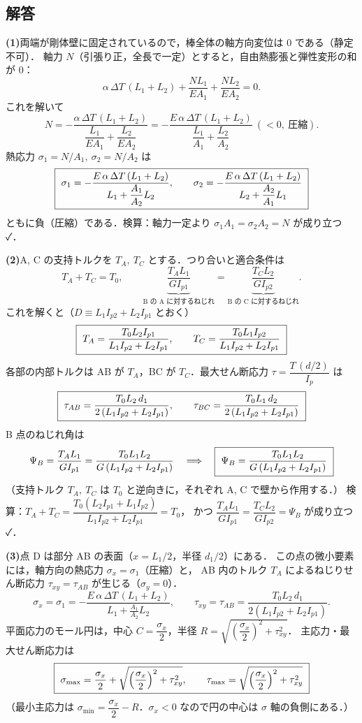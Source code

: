 \documentclass[11pt,a4paper]{article}
\begin{document}
\subsection*{解答}

\noindent\textbf{(1)}\quad 両端が剛体壁に固定されているので，棒全体の軸方向変位は 0 である（静定不可）．
軸力 $N$（引張り正，全長で一定）とすると，自由熱膨張と弾性変形の和が 0：
\[
  \alpha\,\Delta T\,(L_1+L_2)+\frac{N L_1}{E A_1}+\frac{N L_2}{E A_2}=0 .
\]
これを解いて
\[
  N=-\frac{\alpha\,\Delta T\,(L_1+L_2)}{\dfrac{L_1}{EA_1}+\dfrac{L_2}{EA_2}}
   =-\frac{E\,\alpha\,\Delta T\,(L_1+L_2)}{\dfrac{L_1}{A_1}+\dfrac{L_2}{A_2}}\ (<0,\ \text{圧縮}).
\]
熱応力 $\sigma_1=N/A_1,\ \sigma_2=N/A_2$ は
\[
  \boxed{\,\,\sigma_1=-\frac{E\,\alpha\,\Delta T\,(L_1+L_2)}{\,L_1+\dfrac{A_1}{A_2}L_2\,},\qquad
        \sigma_2=-\frac{E\,\alpha\,\Delta T\,(L_1+L_2)}{\,L_2+\dfrac{A_2}{A_1}L_1\,}\,\,}
\]
ともに負（圧縮）である．検算：軸力一定より $\sigma_1 A_1=\sigma_2 A_2=N$ が成り立つ ✓．

\medskip
\noindent\textbf{(2)}\quad A, C の支持トルクを $T_A,\ T_C$ とする．つり合いと適合条件は
\[
  T_A+T_C=T_0,\qquad
  \underbrace{\frac{T_A L_1}{G I_{p1}}}_{\text{B の A に対するねじれ}}
   =\underbrace{\frac{T_C L_2}{G I_{p2}}}_{\text{B の C に対するねじれ}} .
\]
これを解くと（$D\equiv L_1 I_{p2}+L_2 I_{p1}$ とおく）
\[
  \boxed{\,\,T_A=\frac{T_0 L_2 I_{p1}}{L_1 I_{p2}+L_2 I_{p1}},\qquad
        T_C=\frac{T_0 L_1 I_{p2}}{L_1 I_{p2}+L_2 I_{p1}}\,\,}
\]
各部の内部トルクは AB が $T_A$，BC が $T_C$．最大せん断応力 $\tau=\dfrac{T\,(d/2)}{I_p}$ は
\[
  \boxed{\,\,\tau_{AB}=\frac{T_0 L_2\,d_1}{2\,(L_1 I_{p2}+L_2 I_{p1})},\qquad
        \tau_{BC}=\frac{T_0 L_1\,d_2}{2\,(L_1 I_{p2}+L_2 I_{p1})}\,\,}
\]
B 点のねじれ角は
\[
  \Psi_B=\frac{T_A L_1}{G I_{p1}}=\frac{T_0 L_1 L_2}{G\,(L_1 I_{p2}+L_2 I_{p1})}
  \quad\Longrightarrow\quad
  \boxed{\,\,\Psi_B=\frac{T_0 L_1 L_2}{G\,(L_1 I_{p2}+L_2 I_{p1})}\,\,}
\]
（支持トルク $T_A,\ T_C$ は $T_0$ と逆向きに，それぞれ A, C で壁から作用する．）
検算：$T_A+T_C=\dfrac{T_0(L_2 I_{p1}+L_1 I_{p2})}{L_1 I_{p2}+L_2 I_{p1}}=T_0$，
かつ $\dfrac{T_A L_1}{GI_{p1}}=\dfrac{T_C L_2}{GI_{p2}}=\Psi_B$ が成り立つ ✓．

\medskip
\noindent\textbf{(3)}\quad 点 D は部分 AB の表面（$x=L_1/2$，半径 $d_1/2$）にある．
この点の微小要素には，軸方向の熱応力 $\sigma_x=\sigma_1$（圧縮）と，
AB 内のトルク $T_A$ によるねじりせん断応力 $\tau_{xy}=\tau_{AB}$ が生じる（$\sigma_y=0$）．
\[
  \sigma_x=\sigma_1=-\frac{E\,\alpha\,\Delta T\,(L_1+L_2)}{L_1+\frac{A_1}{A_2}L_2},\qquad
  \tau_{xy}=\tau_{AB}=\frac{T_0 L_2\,d_1}{2(L_1 I_{p2}+L_2 I_{p1})}.
\]
平面応力のモール円は，中心 $C=\dfrac{\sigma_x}{2}$，半径 $R=\sqrt{\left(\dfrac{\sigma_x}{2}\right)^2+\tau_{xy}^2}$．
主応力・最大せん断応力は
\[
  \boxed{\,\,\sigma_{\max}=\frac{\sigma_x}{2}+\sqrt{\left(\frac{\sigma_x}{2}\right)^2+\tau_{xy}^2},
   \qquad
   \tau_{\max}=\sqrt{\left(\frac{\sigma_x}{2}\right)^2+\tau_{xy}^2}\,\,}
\]
（最小主応力は $\sigma_{\min}=\dfrac{\sigma_x}{2}-R$．$\sigma_x<0$ なので円の中心は $\sigma$ 軸の負側にある．）
\end{document}
